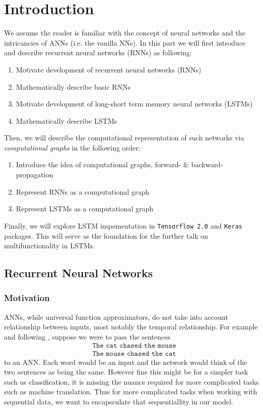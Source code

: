 \section*{Introduction}

We assume the reader is familiar with the concept of neural networks and the intricancies of ANNs (i.e. the vanilla NNs). In this part we will first introduce and describe recurrent neural networks (RNNs) as following:
\begin{enumerate}
    \item Motivate development of recurrent neural networks (RNNs)
    \item Mathematically describe basic RNNs
    \item Motivate development of long-short term memory neural networks (LSTMs)
    \item Mathematically describe LSTMs
\end{enumerate}
Then, we will describe the computational representation of such networks via \textit{computational graphs} in the following order:
\begin{enumerate}
    \item Introduce the idea of computational graphs, forward- \& backward-propagation
    \item Represent RNNs as a computational graph
    \item Represent LSTMs as a computational graph
\end{enumerate}

Finally, we will explore LSTM impementation in \texttt{Tensorflow 2.0} and \texttt{Keras} packages. This will serve as the foundation for the further talk on multifunctionality in LSTMs.

\subsection*{Recurrent Neural Networks}
\subsubsection*{Motivation}
ANNs, while universal function approximators, do not take into account relationship between inputs, most notably the temporal relationship. For example and following \cite{aggarwalNeuralNetworksDeep2018}, suppose we were to pass the sentences
\begin{align}
    &\texttt{The cat chased the mouse}\\
    &\texttt{The mouse chased the cat}
\end{align}
to an ANN. Each word would be an input and the network would think of the two sentences as being the same. However fine this might be for a simpler task such as classification, it is missing the nuance required for more complicated tasks such as machine translation. Thus for more complicated tasks when working with sequential data, we want to encapsculate that sequentiallity in our model.

